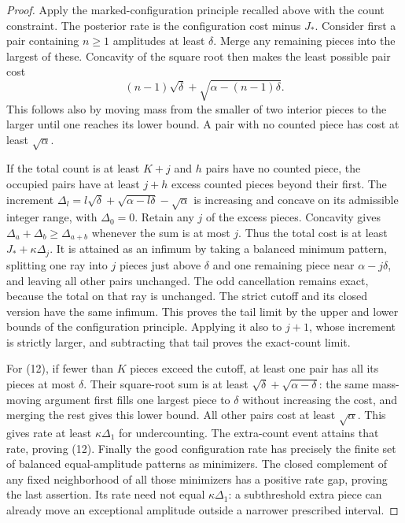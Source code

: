 \documentclass[11pt]{article}
\begin{document}
\begin{proof}
Apply the marked-configuration principle recalled above with the count
constraint. The posterior rate is the configuration cost minus $J_*$.
Consider first a pair containing $n\ge1$ amplitudes at least $\delta$.
Merge any remaining pieces into the largest of these. Concavity of the
square root then makes the least possible pair cost
\[
            (n-1)\sqrt\delta+\sqrt{\alpha-(n-1)\delta}.
 \tag{13}
\]
This follows also by moving mass from the smaller of two interior
pieces to the larger until one reaches its lower bound. A pair with
no counted piece has cost at least $\sqrt\alpha$.

If the total count is at least $K+j$ and $h$ pairs have no counted
piece, the occupied pairs have at least $j+h$ excess counted pieces
beyond their first. The increment
$\Delta_l=l\sqrt\delta+\sqrt{\alpha-l\delta}-\sqrt\alpha$
is increasing and concave on its admissible integer range, with
$\Delta_0=0$. Retain any $j$ of the excess pieces. Concavity gives
$\Delta_a+\Delta_b\ge\Delta_{a+b}$ whenever the sum is at most $j$.
Thus the total cost is at least $J_*+\kappa\Delta_j$.
It is attained as an infimum by taking a balanced minimum pattern,
splitting one ray into $j$ pieces just above $\delta$ and one remaining
piece near $\alpha-j\delta$, and leaving all other pairs unchanged.
The odd cancellation remains exact, because the total on that ray is
unchanged. The strict cutoff and its closed version have the same
infimum. This proves the tail limit by the upper and lower bounds of
the configuration principle. Applying it also to $j+1$, whose increment
is strictly larger, and subtracting that tail proves the exact-count
limit.

For (12), if fewer than $K$ pieces exceed the cutoff, at least one pair
has all its pieces at most $\delta$. Their square-root sum is at least
$\sqrt\delta+\sqrt{\alpha-\delta}$: the same mass-moving argument first
fills one largest piece to $\delta$ without increasing the cost, and
merging the rest gives this lower bound.
All other pairs cost at least $\sqrt\alpha$. This gives rate at least
$\kappa\Delta_1$ for undercounting. The extra-count event attains that
rate, proving (12). Finally the good configuration rate has precisely
the finite set of balanced equal-amplitude patterns as minimizers.
The closed complement of any fixed neighborhood of all those minimizers
has a positive rate gap, proving the last assertion. Its rate need not
equal $\kappa\Delta_1$: a subthreshold extra piece can already move an
exceptional amplitude outside a narrower prescribed interval.
\end{proof}
\end{document}
